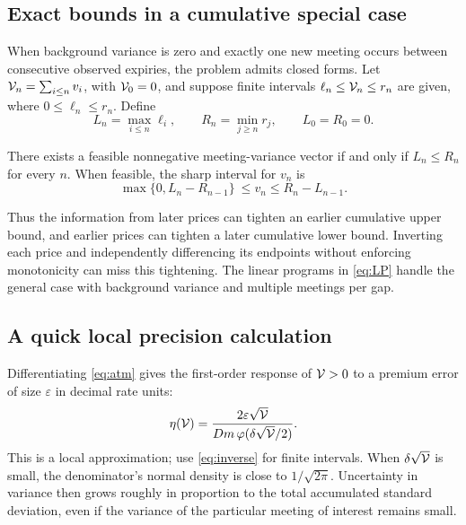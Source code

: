 \subsection{Exact bounds in a cumulative special case}
When background variance is zero and exactly one new meeting occurs between consecutive observed expiries, the problem admits closed forms. Let $\mathcal V_n=\sum_{i\leq n}v_i$, with $\mathcal V_0=0$, and suppose finite intervals $\ell_n\leq \mathcal V_n\leq r_n$ are given, where $0\leq\ell_n\leq r_n$. Define
\begin{equation}\label{eq:envelopes}
L_n=\max_{i\leq n}\ell_i,\qquad R_n=\min_{j\geq n}r_j,
\qquad L_0=R_0=0.
\end{equation}
\begin{proposition}\label{prop:cumulative}
There exists a feasible nonnegative meeting-variance vector if and only if $L_n\leq R_n$ for every $n$. When feasible, the sharp interval for $v_n$ is
\begin{equation}\label{eq:cumbounds}
\max\{0,L_n-R_{n-1}\}\ \leq v_n\leq R_n-L_{n-1}.
\end{equation}
\end{proposition}
Thus the information from later prices can tighten an earlier cumulative upper bound, and earlier prices can tighten a later cumulative lower bound. Inverting each price and independently differencing its endpoints without enforcing monotonicity can miss this tightening. The linear programs in \eqref{eq:LP} handle the general case with background variance and multiple meetings per gap.

\subsection{A quick local precision calculation}
Differentiating \eqref{eq:atm} gives the first-order response of $\mathcal V>0$ to a premium error of size $\varepsilon$ in decimal rate units:
\begin{equation}\label{eq:eta}
\eta(\mathcal V)=\frac{2\varepsilon\sqrt{\mathcal V}}
 {Dm\,\varphi(\delta\sqrt{\mathcal V}/2)}.
\end{equation}
This is a local approximation; use \eqref{eq:inverse} for finite intervals. When $\delta\sqrt{\mathcal V}$ is small, the denominator's normal density is close to $1/\sqrt{2\pi}$. Uncertainty in variance then grows roughly in proportion to the total accumulated standard deviation, even if the variance of the particular meeting of interest remains small.

